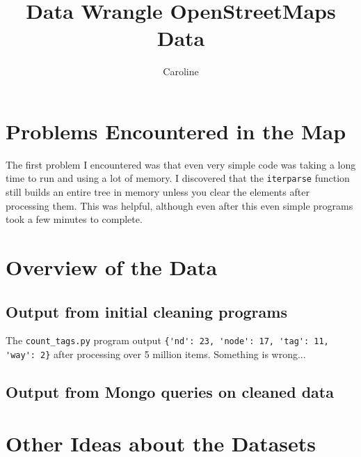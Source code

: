 \documentclass{article}
\author{Caroline}
\title{Data Wrangle OpenStreetMaps Data}
\begin{document}
    \maketitle
    \section{Problems Encountered in the Map}
        The first problem I encountered was that even very simple code was
        taking a long time to run and using a lot of memory. I discovered that
        the \texttt{iterparse} function still builds an entire tree in memory unless
        you clear the elements after processing them. This was helpful, although
        even after this even simple programs took a few minutes to complete.
    \section{Overview of the Data}
        \subsection{Output from initial cleaning programs}
            The \texttt{count\_tags.py} program output
            \verb"{'nd': 23, 'node': 17, 'tag': 11, 'way': 2}" after processing over
            5 million items. Something is wrong...
        \subsection{Output from Mongo queries on cleaned data}
    \section{Other Ideas about the Datasets}
\end{document}
